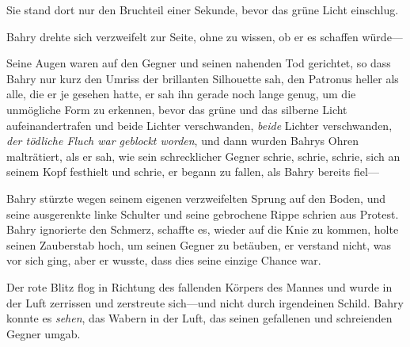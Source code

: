 Sie stand dort nur den Bruchteil einer Sekunde, bevor das grüne Licht einschlug.

\later

Bahry drehte sich verzweifelt zur Seite, ohne zu wissen, ob er es schaffen würde—

Seine Augen waren auf den Gegner und seinen nahenden Tod gerichtet, so dass Bahry nur kurz den Umriss der brillanten Silhouette sah, den Patronus heller als alle, die er je gesehen hatte, er sah ihn gerade noch lange genug, um die unmögliche Form zu erkennen, bevor das grüne und das silberne Licht aufeinandertrafen und beide Lichter verschwanden, \emph{beide} Lichter verschwanden, \emph{der tödliche Fluch war geblockt worden}, und dann wurden Bahrys Ohren malträtiert, als er sah, wie sein schrecklicher Gegner schrie, schrie, schrie, sich an seinem Kopf festhielt und schrie, er begann zu fallen, als Bahry bereits fiel—

Bahry stürzte wegen seinem eigenen verzweifelten Sprung auf den Boden, und seine ausgerenkte linke Schulter und seine gebrochene Rippe schrien aus Protest. Bahry ignorierte den Schmerz, schaffte es, wieder auf die Knie zu kommen, holte seinen Zauberstab hoch, um seinen Gegner zu betäuben, er verstand nicht, was vor sich ging, aber er wusste, dass dies seine einzige Chance war.


Der rote Blitz flog in Richtung des fallenden Körpers des Mannes und wurde in der Luft zerrissen und zerstreute sich—und nicht durch irgendeinen Schild. Bahry konnte es \emph{sehen}, das Wabern in der Luft, das seinen gefallenen und schreienden Gegner umgab.

